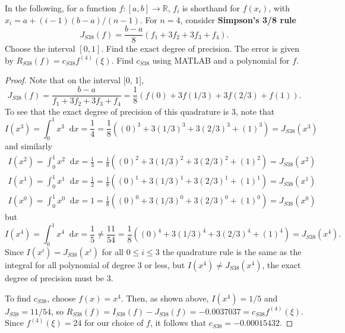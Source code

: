 \documentclass[12pt]{article}
\theoremstyle{definition}
\newenvironment{custompbm}[1]
  {\renewcommand\theproblem{#1}\problem}
  {\endproblem}
\newcommand*\diff{\mathop{}\!\mathrm{d}}
\begin{document}
\begin{custompbm}{9.3.1}
  In the following, for a function $f: [a,b] \to \mathbb{R}$, $f_i$ is shorthand
  for $f(x_i)$, with $x_i = a + (i-1)(b-a)/(n-1)$. For $n=4$, consider \textbf{Simpson's 3/8 rule}
  \[
    J_{S38}(f) = \frac{b-a}{8}(f_1 + 3f_2 + 3f_3 + f_4).
  \]
  Choose the interval $[0,1]$. Find the exact degree of precision. The error is
  given by $R_{S38}(f) = c_{S38} f^{(4)}(\xi)$. Find $c_{S38}$ using MATLAB and a
  polynomial for $f$.
\end{custompbm}

\begin{proof}
  Note that on the interval [0, 1],
  \[
    J_{S38}(f) = \frac{b-a}{f_1 + 3f_2 + 3f_3 + f_4} = \frac{1}{8}(f(0) + 3f(1/3) + 3f(2/3) + f(1)).
  \]
  To see that the exact degree of precision of this
  quadrature is 3, note that
  \[
      I(x^3) = \int_0^1 x^3 \diff{x} = \frac{1}{4} = \frac{1}{8}\left((0)^3 + 3 (1/3)^3 + 3 (2/3)^3 + (1)^3\right) = J_{S38}(x^3)
  \]
  and similarly
  \begin{align*}
      I(x^2) = \int_0^1 x^2 \diff{x} = \frac{1}{3} = \frac{1}{8}\left((0)^2 + 3 (1/3)^2 + 3 (2/3)^2 + (1)^2\right) = J_{S38}(x^2) \\
      I(x^1) = \int_0^1 x^1 \diff{x} = \frac{1}{2} = \frac{1}{8}\left((0)^1 + 3 (1/3)^1 + 3 (2/3)^1 + (1)^1\right) = J_{S38}(x^1) \\
      I(x^0) = \int_0^1 x^0 \diff{x} = 1 = \frac{1}{8}\left((0)^0 + 3 (1/3)^0 + 3 (2/3)^0 + (1)^0\right) = J_{S38}(x^0)
  \end{align*}
  but
  \[
    I(x^4) = \int_0^1 x^4 \diff{x} = \frac{1}{5} \neq \frac{11}{54} = \frac{1}{8}\left((0)^4 + 3 (1/3)^4 + 3 (2/3)^4 + (1)^4\right) = J_{S38}(x^4).
  \]
  Since $I(x^i) = J_{S38}(x^i)$ for all $0 \leq i \leq 3$ the quadrature rule is
  the same as the integral for all polynomial of degree 3 or less, but $I(x^4) \neq J_{S38}(x^4)$,
  the exact degree of precision must be 3.

  To find $c_{S38}$, choose $f(x) = x^4$. Then, as shown above, $I(x^4) = 1/5$ and $J_{S38} = 11/54$,
  so $R_{S38}(f) = I_{S38}(f) - J_{S38}(f) = -0.0037037 = c_{S38} f^{(4)}(\xi)$. Since
  $f^{(4)}(\xi) = 24$ for our choice of $f$, it follows that $c_{S38} = -0.00015432$.
\end{proof}
\end{document}
